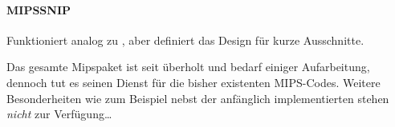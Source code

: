 \paragraph{MIPSSNIP}
Funktioniert analog zu , aber definiert das Design für kurze Ausschnitte.

\begin{bemerkung}[MIPS]
    Das gesamte Mipspaket ist seit  überholt und bedarf einiger Aufarbeitung, dennoch tut es seinen Dienst für die bisher existenten MIPS-Codes. Weitere Besonderheiten wie zum Beispiel  nebst der anfänglich implementierten stehen \emph{nicht} zur Verfügung\ldots
\end{bemerkung}


